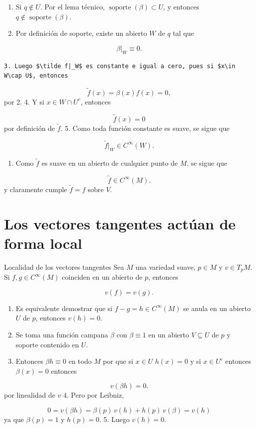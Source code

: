 \begin{bookproof}{}
\begin{itemize}
\begin{enumerate}
\item Si $q\notin U$. Por el lema técnico, $\operatorname{soporte}(\beta)\subset U$, y entonces $q\notin \operatorname{soporte}(\beta)$.
\item Por definición de soporte, existe un abierto $W$ de $q$ tal que
\end{enumerate}
\end{itemize}
\[
\beta |_W\equiv 0.
\]
\begin{Verbatim}[fontsize=\small]
 3. Luego $\tilde f|_W$ es constante e igual a cero, pues si $x\in W\cap U$, entonces 
\end{Verbatim}
\[
\tilde f(x)=\beta (x)f(x)=0,
\]
por 2. 4. Y si $x\in W\cap U^c$, entonces

\[
\tilde f(x)=0
\]
por definición de $\tilde f$. 5. Como toda función constante es suave, se sigue que

\[
\tilde f|_W\in C^\infty(W).
\]
\begin{enumerate}[start=6]
\item Como $\tilde f$ es suave en un abierto de cualquier punto de $M$, se sigue que
\end{enumerate}
\[
\tilde f\in C^\infty(M).
\]
y claramente cumple $\widetilde{f}=f$ sobre $V$.

\bookqed
\end{bookproof}
\label{blk:405b16}
\section{Los vectores tangentes actúan de forma local}
\begin{bookproposition}{Localidad de los vectores tangentes}
Sea $M$ una variedad suave, $p\in M$ y $v\in T_pM$. Si $f,g\in C^\infty(M)$ coinciden en un abierto de $p$, entonces

\[
v(f)=v(g).
\]
\end{bookproposition}
\begin{bookproof}{}
\begin{enumerate}
\item Es equivalente demostrar que si $f-g=h\in C^\infty(M)$ se anula en un abierto $U$ de $p$, entonces $v(h)=0$.
\item Se toma una función campana $\beta$ con $\beta\equiv 1$ en un abierto $V\subseteq U$ de $p$ y soporte contenido en $U$.
\item Entonces $\beta h\equiv 0$ en todo $M$ por que si $x\in U$ $h(x)=0$ y si $x\in U^{c}$ entonces $\beta(x)=0$ entonces
\end{enumerate}
\[
v(\beta h)=0.
\]
por linealidad de $v$ 4. Pero por Leibniz,

\[
0=v(\beta h)=\beta(p)\,v(h)+h(p)\,v(\beta)=v(h)
\]
ya que $\beta(p)=1$ y $h(p)=0$. 5. Luego $v(h)=0$.

\bookqed
\end{bookproof}
\label{blk:b713ca}
